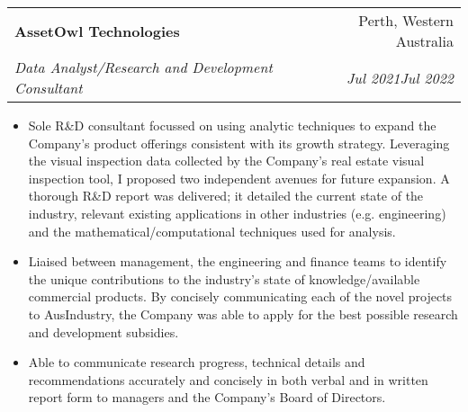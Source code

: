 \documentclass[letterpaper,10.8pt]{article}
\makeatletter
\newcommand{\resumeItem}[2]{
  \item\small{
    \textbf{#1}{#2 \vspace{-2pt}}
  }
}
\newcommand{\resumeSubheading}[4]{
  \vspace{-1pt}\item
    \begin{tabular*}{0.97\textwidth}{l@{\extracolsep{\fill}}r}
      \textbf{#1} & #2 \\
      \textit{\small#3} & \textit{\small #4} \\
    \end{tabular*}\vspace{-5pt}
}
\newcommand{\resumeItemListStart}{\begin{itemize}}
\newcommand{\resumeItemListEnd}{\end{itemize}\vspace{-5pt}}
\makeatother
\begin{document}
    \resumeSubheading
    {AssetOwl Technologies}{Perth, Western Australia}
    {Data Analyst/Research and Development Consultant}{Jul 2021\textendash Jul 2022}
    \resumeItemListStart
        \resumeItem{}{Sole R\&D consultant focussed on using analytic techniques to expand the Company's product offerings consistent with its growth strategy. Leveraging the visual inspection data collected by the Company's real estate visual inspection tool, I proposed two independent avenues for future expansion. A thorough R\&D report was delivered; it detailed the current state of the industry, relevant existing applications in other industries (e.g. engineering) and the mathematical/computational techniques used for analysis.}
        \resumeItem{}{Liaised between management, the engineering and finance teams to identify the unique contributions to the industry's state of knowledge/available commercial products. By concisely communicating each of the novel projects to AusIndustry, the Company was able to apply for the best possible research and development subsidies.}
        \resumeItem{}{Able to communicate research progress, technical details and recommendations accurately and concisely in both verbal and in written report form to managers and the Company's Board of Directors.}
    \resumeItemListEnd
      
\end{document}
